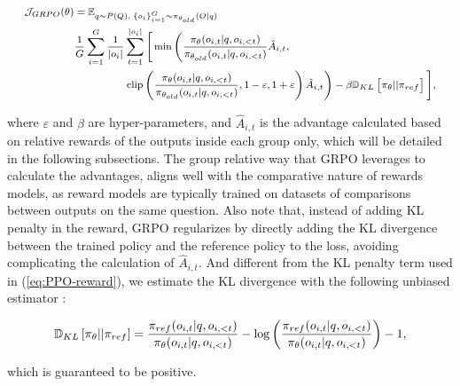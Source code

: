 \begin{itemize}[topsep=0pt]
\begin{itemize}[topsep=0pt]
\begin{equation}
\footnotesize
\begin{split}
    \mathcal{J}_{GRPO}(\theta) &= \mathbb{E}_{q \sim P(Q),\; \{o_i\}_{i=1}^G \sim \pi_{\theta_{old}}(O|q)}  \\
    & \frac{1}{G}\sum_{i=1}^G \frac{1}{|o_i|} \sum_{t=1}^{|o_i|} \Bigg[ \min \Bigg( \frac{\pi_\theta(o_{i,t} | q, o_{i,<t})}{\pi_{\theta_{old}}(o_{i,t} | q, o_{i,<t})} \hat{A}_{i,t}, \\
    & \hspace{5em} \text{clip} \left( \frac{\pi_\theta(o_{i,t} | q, o_{i,<t})}{\pi_{\theta_{old}}(o_{i,t} | q, o_{i,<t})}, 1 - \varepsilon, 1 + \varepsilon \right)  \hat{A}_{i,t} \Bigg) - \beta \mathbb{D}_{KL}\left[\pi_{\theta} || \pi_{ref}\right] \Bigg],
\end{split}
\label{eq:GRPO-obj}
\end{equation}

where $\varepsilon$ and $\beta$ are hyper-parameters, and $\hat{A}_{i,t}$  is the advantage calculated based on relative rewards of the outputs inside each group only, which will be detailed in the following subsections. The group relative way that GRPO leverages to calculate the advantages, aligns well with the comparative nature of rewards models,  as reward models are typically trained on datasets of comparisons between outputs on the same question. Also note that, instead of adding KL penalty in the reward, GRPO regularizes by directly adding the KL divergence between the trained policy and the reference policy to the loss, avoiding complicating the calculation of  $\hat{A}_{i,t}$. And different from the KL penalty term used in (\ref{eq:PPO-reward}), we estimate the KL divergence with the following unbiased estimator \citep{kl_approx}:

\begin{equation}
\small
    \mathbb{D}_{KL}\left[\pi_{\theta} || \pi_{ref}\right] = \frac{\pi_{ref}(o_{i,t}|q,o_{i,<t})}{\pi_{\theta}(o_{i,t}|q,o_{i,<t})} - \log\left(\frac{\pi_{ref}(o_{i,t}|q,o_{i,<t})}{\pi_{\theta}(o_{i,t}|q,o_{i,<t})}\right) - 1,
\end{equation}

which is guaranteed to be positive.


\end{itemize}
\end{itemize}

